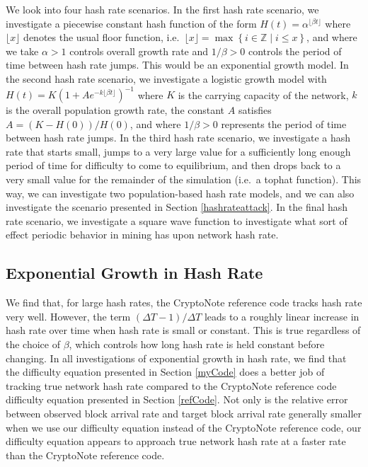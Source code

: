 \documentclass[12pt,english]{mrl}
\theoremstyle{definition}
\renewcommand{\leq}{\leqslant}
\numberwithin{equation}{section}
\numberwithin{figure}{section}
\numberwithin{equation}{section}
\numberwithin{equation}{section}
\numberwithin{figure}{section}
\begin{document}
We look into four hash rate scenarios. In the first hash rate scenario, we investigate a piecewise constant hash function of the form $H(t) =  \alpha^{\lfloor \beta t \rfloor}$ where $\lfloor x \rfloor$ denotes the usual floor function, i.e.\ $\lfloor x \rfloor = \max\left\{i \in \mathbb{Z} \mid i \leq x\right\}$, and where we take $\alpha > 1$ controls overall growth rate and $1/\beta > 0$ controls the period of time between hash rate jumps. This would be an exponential growth model. In the second hash rate scenario, we investigate a logistic growth model with $H(t) = K(1 + Ae^{-k\lfloor \beta t\rfloor })^{-1}$ where $K$ is the carrying capacity of the network, $k$ is the overall population growth rate, the constant $A$ satisfies $A = (K-H(0))/H(0)$, and where $1/\beta > 0$ represents the period of time between hash rate jumps. In the third hash rate scenario, we investigate a hash rate that starts small, jumps to a very large value for a sufficiently long enough period of time for difficulty to come to equilibrium, and then drops back to a very small value for the remainder of the simulation (i.e.\ a tophat function). This way, we can investigate two population-based hash rate models, and we can also investigate the scenario presented in Section \ref{hashrateattack}. In the final hash rate scenario, we investigate a square wave function to investigate what sort of effect periodic behavior in mining has upon network hash rate.

\subsection{Exponential Growth in Hash Rate}\label{expComp}

We find that, for large hash rates, the CryptoNote reference code tracks hash rate very well. However, the term $(\Delta T - 1)/\Delta T$ leads to a roughly linear increase in hash rate over time when hash rate is small or constant. This is true regardless of the choice of $\beta$, which controls how long hash rate is held constant before changing. In all investigations of exponential growth in hash rate, we find that the difficulty equation presented in Section \ref{myCode} does a better job of tracking true network hash rate compared to the CryptoNote reference code difficulty equation presented in Section \ref{refCode}. Not only is the relative error between observed block arrival rate and target block arrival rate generally smaller when we use our difficulty equation instead of the CryptoNote reference code, our difficulty equation appears to approach true network hash rate at a faster rate than the CryptoNote reference code.
\end{document}
